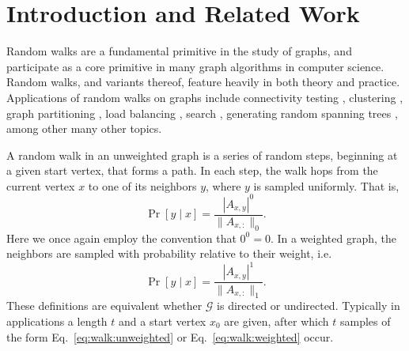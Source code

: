 \documentclass{report}
\begin{document}
\section{Introduction and Related Work}
 \label{walks:sec:intro}

Random walks are a fundamental primitive in the study of graphs, and participate as a core primitive in many graph algorithms in computer science.
Random walks, and variants thereof, feature heavily in both theory and practice. 
Applications of random walks on graphs include connectivity testing \cite{reingold2008undirected}, clustering \cite{andersen2009finding}, graph partitioning \cite{charikar2003better, andersen2007using, spielman2013local}, load balancing \cite{karger2004simple}, search \cite{adamic2001search, lv2002search}, generating random spanning trees \cite{broder1989generating}, among other many other topics. 

A random walk in an unweighted graph is a series of random steps, beginning at a given start vertex, that forms a path.
In each step, the walk hops from the current vertex $x$ to one of its neighbors $y$, where $y$ is sampled uniformly.
That is,  
%
\begin{equation} \label{eq:walk:unweighted}
	\Pr [ y \mid x] = \frac{|A_{x,y}|^0}{\|A_{x,:}\|_0}.
\end{equation}
%
Here we once again employ the convention that $0^0 = 0$.
In a weighted graph, the neighbors are sampled with probability relative to their weight, i.e. 
%
\begin{equation} \label{eq:walk:weighted}
	\Pr [ y \mid x] =  \frac{|A_{x,y}|^1}{\|A_{x,:}\|_1}.
\end{equation}
%
These definitions are equivalent whether $\mathcal{G}$ is directed or undirected.
Typically in applications a length $t$ and a start vertex $x_0$ are given, after which $t$ samples of the form Eq.~\eqref{eq:walk:unweighted} or Eq.~\ref{eq:walk:weighted} occur.
\end{document}
